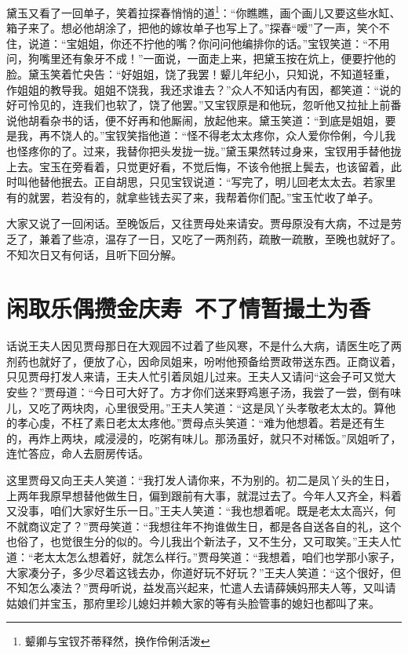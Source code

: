 \documentclass[12pt,oneside]{book}
\begin{document}
黛玉又看了一回单子，笑着拉探春悄悄的道\footnote{颦卿与宝钗芥蒂释然，换作伶俐活泼}：“你瞧瞧，画个画儿又要这些水缸、箱子来了。想必他胡涂了，把他的嫁妆单子也写上了。”探春“嗳”了一声，笑个不住，说道：“宝姐姐，你还不拧他的嘴？你问问他编排你的话。”宝钗笑道：“不用问，狗嘴里还有象牙不成！”一面说，一面走上来，把黛玉按在炕上，便要拧他的脸。黛玉笑着忙央告：“好姐姐，饶了我罢！颦儿年纪小，只知说，不知道轻重，作姐姐的教导我。姐姐不饶我，我还求谁去？”众人不知话内有因，都笑道：“说的好可怜见的，连我们也软了，饶了他罢。”又宝钗原是和他玩，忽听他又拉扯上前番说他胡看杂书的话，便不好再和他厮闹，放起他来。黛玉笑道：“到底是姐姐，要是我，再不饶人的。”宝钗笑指他道：“怪不得老太太疼你，众人爱你伶俐，今儿我也怪疼你的了。过来，我替你把头发拢一拢。”黛玉果然转过身来，宝钗用手替他拢上去。宝玉在旁看着，只觉更好看，不觉后悔，不该令他抿上鬓去，也该留着，此时叫他替他抿去。正自胡思，只见宝钗说道：“写完了，明儿回老太太去。若家里有的就罢，若没有的，就拿些钱去买了来，我帮着你们配。”宝玉忙收了单子。

大家又说了一回闲话。至晚饭后，又往贾母处来请安。贾母原没有大病，不过是劳乏了，兼着了些凉，温存了一日，又吃了一两剂药，疏散一疏散，至晚也就好了。不知次日又有何话，且听下回分解。

 
\chapter{闲取乐偶攒金庆寿~不了情暂撮土为香}
话说王夫人因见贾母那日在大观园不过着了些风寒，不是什么大病，请医生吃了两剂药也就好了，便放了心，因命凤姐来，吩咐他预备给贾政带送东西。正商议着，只见贾母打发人来请，王夫人忙引着凤姐儿过来。王夫人又请问“这会子可又觉大安些？”贾母道：“今日可大好了。方才你们送来野鸡崽子汤，我尝了一尝，倒有味儿，又吃了两块肉，心里很受用。”王夫人笑道：“这是凤丫头孝敬老太太的。算他的孝心虔，不枉了素日老太太疼他。”贾母点头笑道：“难为他想着。若是还有生的，再炸上两块，咸浸浸的，吃粥有味儿。那汤虽好，就只不对稀饭。”凤姐听了，连忙答应，命人去厨房传话。

这里贾母又向王夫人笑道：“我打发人请你来，不为别的。初二是凤丫头的生日，上两年我原早想替他做生日，偏到跟前有大事，就混过去了。今年人又齐全，料着又没事，咱们大家好生乐一日。”王夫人笑道：“我也想着呢。既是老太太高兴，何不就商议定了？”贾母笑道：“我想往年不拘谁做生日，都是各自送各自的礼，这个也俗了，也觉很生分的似的。今儿我出个新法子，又不生分，又可取笑。”王夫人忙道：“老太太怎么想着好，就怎么样行。”贾母笑道：“我想着，咱们也学那小家子，大家凑分子，多少尽着这钱去办，你道好玩不好玩？”王夫人笑道：“这个很好，但不知怎么凑法？”贾母听说，益发高兴起来，忙遣人去请薛姨妈邢夫人等，又叫请姑娘们并宝玉，那府里珍儿媳妇并赖大家的等有头脸管事的媳妇也都叫了来。
\end{document}
